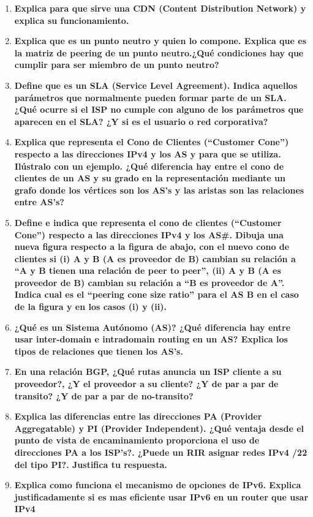 \documentclass[a4paper,10pt]{article}
\begin{document}
\begin{enumerate}
  \item \textbf{Explica para que sirve una CDN (Content Distribution Network) y explica su
funcionamiento.}

  \item \textbf{Explica que es un punto neutro y quien lo compone. Explica que es la matriz de peering
de un punto neutro.¿Qué condiciones hay que cumplir para ser miembro de un punto neutro?}

  \item \textbf{Define que es un SLA (Service Level Agreement). Indica aquellos parámetros que
normalmente pueden formar parte de un SLA. ¿Qué ocurre si el ISP no cumple con alguno de los
parámetros que aparecen en el SLA? ¿Y si es el usuario o red corporativa?}

  \item \textbf{Explica que representa el Cono de Clientes (“Customer Cone”) respecto a las direcciones
IPv4 y los AS y para que se utiliza. Ilústralo con un ejemplo. ¿Qué diferencia hay entre el cono de
clientes de un AS y su grado en la representación mediante un grafo donde los vértices son los
AS’s y las aristas son las relaciones entre AS’s?}

  \item \textbf{Define e indica que representa el cono de clientes (“Customer Cone”) respecto a las
direcciones IPv4 y los AS#. Dibuja una nueva figura respecto a la figura de abajo, con el nuevo
cono de clientes si (i) A y B (A es proveedor de B) cambian su relación a “A y B tienen una relación
de peer to peer”, (ii) A y B (A es proveedor de B) cambian su relación a “B es proveedor de A”.
Indica cual es el “peering cone size ratio” para el AS B en el caso de la figura y en los casos (i) y (ii).}

  \item \textbf{¿Qué es un Sistema Autónomo (AS)? ¿Qué diferencia hay entre usar inter-domain e intradomain routing en un AS? Explica los tipos de relaciones que tienen los AS’s.}

  \item \textbf{En una relación BGP, ¿Qué rutas anuncia un ISP cliente a su proveedor?, ¿Y el proveedor a
su cliente? ¿Y de par a par de transito? ¿Y de par a par de no-transito?}

  \item \textbf{Explica las diferencias entre las direcciones PA (Provider Aggregatable) y PI (Provider
Independent). ¿Qué ventaja desde el punto de vista de encaminamiento proporciona
el uso de direcciones PA a los ISP’s?. ¿Puede un RIR asignar redes IPv4 /22 del tipo
PI?. Justifica tu respuesta.}

  \item \textbf{Explica como funciona el mecanismo de opciones de IPv6. Explica justificadamente si
es mas eficiente usar IPv6 en un router que usar IPv4}
\end{enumerate}
\end{document}
